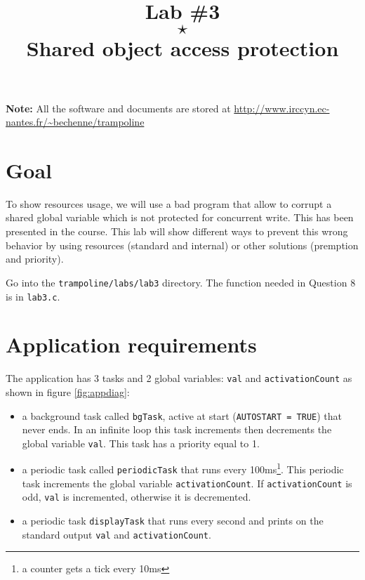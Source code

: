 \documentclass[11pt]{article}
\title{Lab \#3\\$\star$\\Shared object access protection}
\author{}
\begin{document}
\maketitle

{\bf Note:} All the software and documents are stored at \url{http://www.irccyn.ec-nantes.fr/~bechenne/trampoline}

\section{Goal}

To show resources usage, we will use a bad program that allow to corrupt a shared global variable which is not protected for concurrent write. This has been presented in the course. This lab will show different ways to prevent this wrong behavior by using resources (standard and internal) or other solutions (premption and priority).

Go into the \texttt{trampoline/labs/lab3} directory. The function needed in Question 8 is in \texttt{lab3.c}.


\section{Application requirements}
The application has 3 tasks and 2 global variables: \texttt{val} and \texttt{activationCount} as shown in figure \ref{fig:appdiag}:

\begin{itemize}
\item a background task called \texttt{bgTask}, active at start (\texttt{AUTOSTART = TRUE}) that never ends. In an infinite loop this task increments then decrements the global variable \texttt{val}. This task has a priority equal to 1.
\item a periodic task called \texttt{periodicTask} that runs every 100ms\footnote{a counter gets a tick every 10ms}. This periodic task increments the global variable \texttt{activationCount}. If \texttt{activationCount} is odd, \texttt{val} is incremented, otherwise it is decremented.
\item a periodic task \texttt{displayTask} that runs every second and prints on the standard output \texttt{val} and \texttt{activationCount}.
\end{itemize}

\def\alarm#1#2{
  \node[alarm](#1) [#2] {};
  \coordinate (a) at ($(#1.north)$);
  \coordinate (b) at ($(#1.north east)$);
  \coordinate (c) at ($(#1.north west)$);
  \coordinate (d) at ($(#1)$);
  \draw[thick] ($(a)+(-0.1,0)$) rectangle ($(a)+(0.1,0.1)$);
  \draw[rotate=-45,thick] ($(b)+(-0.05,0)$) rectangle ($(b)+(0.05,0.1)$);
  \draw[rotate=45,thick] ($(c)+(-0.05,0)$) rectangle ($(c)+(0.05,0.1)$);
  \draw ($(d)+(0.3,0)$) -- (d) -- ($(d)+(0,0.3)$);
  \node [font=\scriptsize,below=0.5mm of #1] {{\em Alarm}}
}
\end{document}
